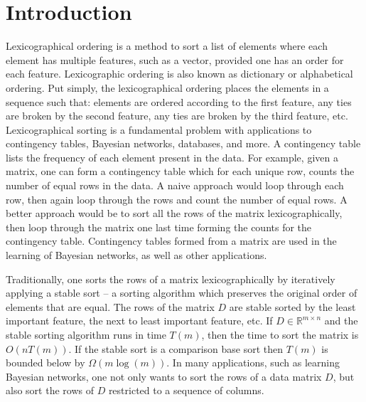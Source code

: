 \documentclass[a4paper,10pt,reqno]{amsart}
\newcommand\R{\mathbb R}
\theoremstyle{definition}
\begin{document}
\section{Introduction}
\label{sec:introduction}
Lexicographical ordering is a method to sort a list of elements where each
element has multiple features, such as a vector, provided one has an order for
each feature. Lexicographic ordering is also known as dictionary or
alphabetical ordering. Put simply, the lexicographical ordering places the
elements in a sequence such that: elements are ordered according to the first
feature, any ties are broken by the second feature, any ties are broken by the
third feature, etc. Lexicographical sorting is a fundamental problem with
applications to contingency tables, Bayesian networks,
databases\cite{poess2003data,lemire2010sorting}, and more. A contingency table
lists the frequency of each element present in the data. For example, given a
matrix, one can form a contingency table which for each unique row, counts the
number of equal rows in the data. A naive approach would loop through each row,
then again loop through the rows and count the number of equal rows. A better
approach would be to sort all the rows of the matrix lexicographically, then
loop through the matrix one last time forming the counts for the contingency
table. Contingency tables formed from a matrix are used in the learning of
Bayesian networks, as well as other applications.

Traditionally, one sorts the rows of a matrix lexicographically by iteratively
applying a stable sort -- a sorting algorithm which preserves the original
order of elements that are equal. The rows of the matrix $D$ are stable sorted by
the least important feature, the next to least important feature, etc. If $D
\in \R^{m \times n}$ and the stable sorting algorithm runs in time $T(m)$, then
the time to sort the matrix is $O(n T(m))$. If the stable sort is a comparison
base sort then $T(m)$ is bounded below by
$\Omega(m\log(m))$\cite{Cormen:2001fk}. In many applications, such as learning
Bayesian networks, one not only wants to sort the rows of a data matrix $D$,
but also sort the rows of $D$ restricted to a sequence of columns. 
\end{document}
